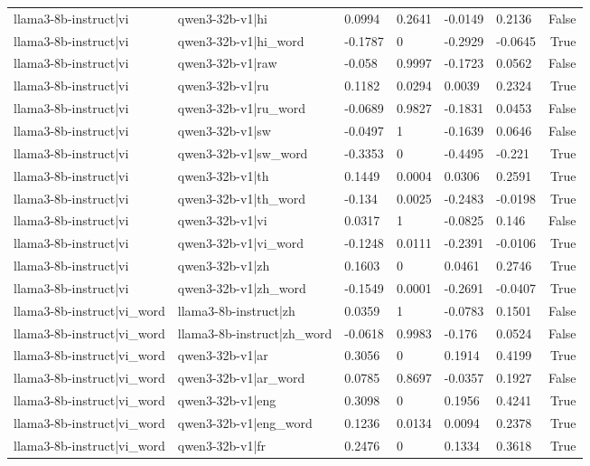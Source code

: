 \begin{table}
\begin{tabular}{llllllr}
llama3-8b-instruct|vi & qwen3-32b-v1|hi & 0.0994 & 0.2641 & -0.0149 & 0.2136 & False \\
llama3-8b-instruct|vi & qwen3-32b-v1|hi_word & -0.1787 & 0 & -0.2929 & -0.0645 & True \\
llama3-8b-instruct|vi & qwen3-32b-v1|raw & -0.058 & 0.9997 & -0.1723 & 0.0562 & False \\
llama3-8b-instruct|vi & qwen3-32b-v1|ru & 0.1182 & 0.0294 & 0.0039 & 0.2324 & True \\
llama3-8b-instruct|vi & qwen3-32b-v1|ru_word & -0.0689 & 0.9827 & -0.1831 & 0.0453 & False \\
llama3-8b-instruct|vi & qwen3-32b-v1|sw & -0.0497 & 1 & -0.1639 & 0.0646 & False \\
llama3-8b-instruct|vi & qwen3-32b-v1|sw_word & -0.3353 & 0 & -0.4495 & -0.221 & True \\
llama3-8b-instruct|vi & qwen3-32b-v1|th & 0.1449 & 0.0004 & 0.0306 & 0.2591 & True \\
llama3-8b-instruct|vi & qwen3-32b-v1|th_word & -0.134 & 0.0025 & -0.2483 & -0.0198 & True \\
llama3-8b-instruct|vi & qwen3-32b-v1|vi & 0.0317 & 1 & -0.0825 & 0.146 & False \\
llama3-8b-instruct|vi & qwen3-32b-v1|vi_word & -0.1248 & 0.0111 & -0.2391 & -0.0106 & True \\
llama3-8b-instruct|vi & qwen3-32b-v1|zh & 0.1603 & 0 & 0.0461 & 0.2746 & True \\
llama3-8b-instruct|vi & qwen3-32b-v1|zh_word & -0.1549 & 0.0001 & -0.2691 & -0.0407 & True \\
llama3-8b-instruct|vi_word & llama3-8b-instruct|zh & 0.0359 & 1 & -0.0783 & 0.1501 & False \\
llama3-8b-instruct|vi_word & llama3-8b-instruct|zh_word & -0.0618 & 0.9983 & -0.176 & 0.0524 & False \\
llama3-8b-instruct|vi_word & qwen3-32b-v1|ar & 0.3056 & 0 & 0.1914 & 0.4199 & True \\
llama3-8b-instruct|vi_word & qwen3-32b-v1|ar_word & 0.0785 & 0.8697 & -0.0357 & 0.1927 & False \\
llama3-8b-instruct|vi_word & qwen3-32b-v1|eng & 0.3098 & 0 & 0.1956 & 0.4241 & True \\
llama3-8b-instruct|vi_word & qwen3-32b-v1|eng_word & 0.1236 & 0.0134 & 0.0094 & 0.2378 & True \\
llama3-8b-instruct|vi_word & qwen3-32b-v1|fr & 0.2476 & 0 & 0.1334 & 0.3618 & True \\

\end{tabular}
\end{table}
